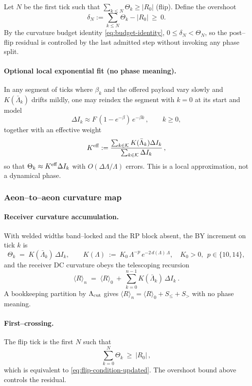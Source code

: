 \documentclass[10pt]{article}
\theoremstyle{definition}
\theoremstyle{plain}
\begin{document}
Let $N$ be the first tick such that $\sum_{k\le N}\Theta_k\ge |R_0|$ (flip). Define the overshoot
\[
\delta_N:=\sum_{k\le N}\Theta_k-|R_0|\ \ge\ 0.
\]
By the curvature budget identity \eqref{eq:budget-identity}, $0\le\delta_N<\Theta_N$, so the post--flip
residual is controlled by the last admitted step without invoking any phase split.

\paragraph{Optional local exponential fit (no phase meaning).}\label{par:uom-main-150}
In any segment of ticks where $\beta_k$ and the offered payload vary slowly and $K(\bar\Lambda_k)$ drifts mildly,
one may reindex the segment with $k=0$ at its start and model
\[
\Delta I_k\approx F\,(1-e^{-\beta})\,e^{-\beta k}\,,\qquad k\ge 0,
\]
together with an effective weight
\[
K^{\rm eff}:=\frac{\sum_{k\in\mathcal K}K(\bar\Lambda_k)\Delta I_k}{\sum_{k\in\mathcal K}\Delta I_k}\,,
\]
so that $\Theta_k\approx K^{\rm eff}\Delta I_k$ with $O(\Delta\Lambda/\Lambda)$ errors. This is a local
approximation, not a dynamical phase.

\subsubsection*{Aeon--to--aeon curvature map}
\label{subsubsec:aeon-map}

\paragraph{Receiver curvature accumulation.}\label{par:uom-main-151}
With welded widths band--locked and the RP block absent, the BY increment on tick $k$ is
\begin{equation}\label{eq:BY-k}
\Theta_k\;=\;K(\bar\Lambda_k)\,\Delta I_k,\qquad
K(\Lambda)\ :=\ K_0\,\Lambda^{-p}\,e^{-2\,d(\Lambda)\,\Lambda},\quad K_0>0,\ \ p\in\{10,14\},
\end{equation}
and the receiver DC curvature obeys the telescoping recursion
\begin{equation}\label{eq:R-evolution}
\boxed{\quad \langle R\rangle_{n}\;=\;\langle R\rangle_0\ +\ \sum_{k=0}^{n-1} K(\bar\Lambda_k)\,\Delta I_k\ .\quad}
\end{equation}
A bookkeeping partition by $\Lambda_{\rm cut}$ gives $\langle R\rangle_n=\langle R\rangle_0+S_{\le}+S_{>}$ with no
phase meaning.

\paragraph{First--crossing.}\label{par:uom-main-152}
The flip tick is the first $N$ such that
\begin{equation}\label{eq:flip-condition-ref}
\sum_{k=0}^{N}\Theta_k\ \ge\ |R_0|\,,
\end{equation}
which is equivalent to \eqref{eq:flip-condition-updated}. The overshoot bound above controls the residual.
\end{document}
